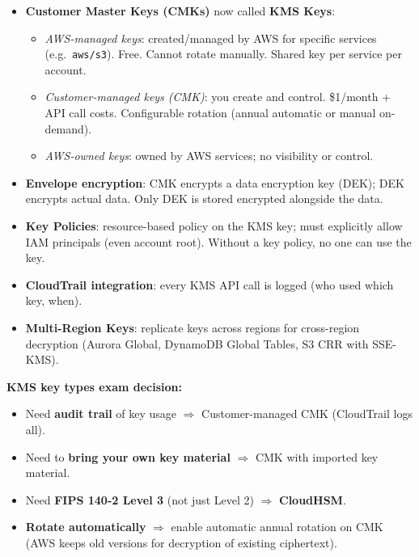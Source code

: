 

\begin{keyfacts}
\begin{itemize}
  \item \textbf{Customer Master Keys (CMKs)} now called \textbf{KMS Keys}:
    \begin{itemize}
      \item \emph{AWS-managed keys}: created/managed by AWS for specific services (e.g.\ \texttt{aws/s3}).
            Free. Cannot rotate manually. Shared key per service per account.
      \item \emph{Customer-managed keys (CMK)}: you create and control. \$1/month + API call costs.
            Configurable rotation (annual automatic or manual on-demand).
      \item \emph{AWS-owned keys}: owned by AWS services; no visibility or control.
    \end{itemize}
  \item \textbf{Envelope encryption}: CMK encrypts a data encryption key (DEK);
        DEK encrypts actual data. Only DEK is stored encrypted alongside the data.
  \item \textbf{Key Policies}: resource-based policy on the KMS key; must explicitly allow
        IAM principals (even account root). Without a key policy, no one can use the key.
  \item \textbf{CloudTrail integration}: every KMS API call is logged (who used which key, when).
  \item \textbf{Multi-Region Keys}: replicate keys across regions for cross-region decryption
        (Aurora Global, DynamoDB Global Tables, S3 CRR with SSE-KMS).
\end{itemize}
\end{keyfacts}

\begin{examtip}
\textbf{KMS key types exam decision:}
\begin{itemize}
  \item Need \textbf{audit trail} of key usage $\Rightarrow$ Customer-managed CMK (CloudTrail logs all).
  \item Need to \textbf{bring your own key material} $\Rightarrow$ CMK with imported key material.
  \item Need \textbf{FIPS 140-2 Level 3} (not just Level 2) $\Rightarrow$ \textbf{CloudHSM}.
  \item \textbf{Rotate automatically} $\Rightarrow$ enable automatic annual rotation on CMK
        (AWS keeps old versions for decryption of existing ciphertext).
\end{itemize}
\end{examtip}

